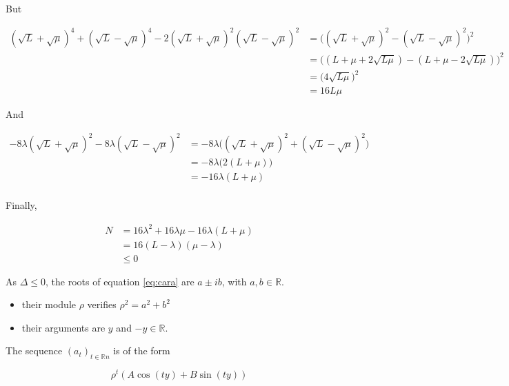 \documentclass[
10pt, %
a4paper, %
oneside, %
headinclude,footinclude, %
BCOR5mm, %
]{scrartcl}
\begin{document}
But

\begin{equation}
    \begin{aligned}
        \label{eq:}
	( \sqrt{L} + \sqrt{\mu} )^4+( \sqrt{L} - \sqrt{\mu} )^4-  2 ( \sqrt{L} + \sqrt{\mu} )^2( \sqrt{L} - \sqrt{\mu} )^2&= \Big(( \sqrt{L} + \sqrt{\mu} )^2- ( \sqrt{L} - \sqrt{\mu} )^2 \Big)^2\\
	&= \Big( (L+\mu+2 \sqrt{L\mu})-(L+\mu-2 \sqrt{L\mu})  \Big)^2\\
	&= \Big( 4 \sqrt{L\mu}   \Big)^2\\
	&= 16L\mu
    \end{aligned}
\end{equation}

And 

\begin{equation}
   \begin{aligned}
       \label{eq:}
       -8\lambda( \sqrt{L} + \sqrt{\mu} )^2-8\lambda ( \sqrt{L} - \sqrt{\mu} )^2&= -8\lambda\Big(( \sqrt{L} + \sqrt{\mu} )^2+( \sqrt{L} - \sqrt{\mu} )^2\Big)\\
       &= -8\lambda\Big(2 (L+\mu)\Big)\\
       &= -16\lambda(L+\mu)\\
   \end{aligned} 
\end{equation}

Finally, 

\begin{equation}
    \begin{aligned}
        \label{eq:}
	N &= 16\lambda^2+16\lambda \mu -16\lambda(L+\mu)\\
	&= 16(L-\lambda)(\mu-\lambda)\\
	&\leq 0
    \end{aligned}
\end{equation}

As $\Delta \leq 0$, the roots of equation \ref{eq:cara} are $a\pm ib$, with $a, b \in \mathbb{R} $.
\begin{itemize}
    \item their module $\rho$ verifies $\rho^2 = a^2+b^2$
    \item their arguments are $ y$ and $-y\in \mathbb{R} $. 
\end{itemize}

The sequence $(a_t)_{t\in \mathbb{R} n}$ is of the form

\begin{equation}
    \label{eq:seq}
    \rho^t(A \cos (ty)+B\sin (ty))
\end{equation}
\end{document}
